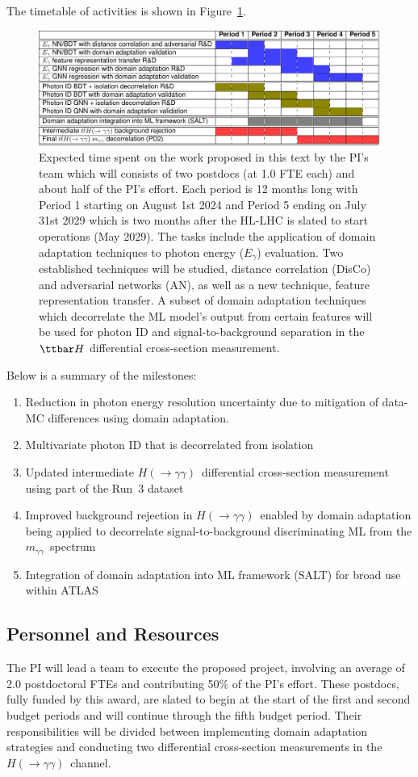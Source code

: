 \documentclass[letter, USenglish, 11pt, subfigure]{article}
\newcommand{\myy}{\ensuremath{m_{\gamma\gamma}}}
\newcommand{\hyy}{\ensuremath{H(\to\gamma\gamma)}}
\begin{document}
The timetable of activities is shown in Figure~\ref{fig:timetable}.
\begin{figure}[!htbp]
  \centering
  \includegraphics[width=\textwidth]{figures/timeline.pdf}
  \caption{Expected time spent on the work proposed in this text by the PI's team which will consists of two postdocs (at 1.0 FTE each) and about half of the PI's effort. Each period is 12 months long with Period 1 starting on August 1st 2024 and Period 5 ending on July 31st 2029 which is two months after the HL-LHC is slated to start operations (May 2029). The tasks include the application of domain adaptation  techniques to photon energy ($E_{\gamma}$) evaluation. Two established techniques will be studied, distance correlation (DisCo) and adversarial networks (AN), as well as a new technique, feature representation transfer. A subset of domain adaptation techniques which decorrelate the ML model's output from certain features will be used for photon ID and signal-to-background separation in the $\ttbar H$ differential cross-section measurement.
  }
  \label{fig:timetable}
\end{figure}

Below is a summary of the milestones:
\begin{enumerate}
\item Reduction in photon energy resolution uncertainty due to mitigation of data-MC differences using domain adaptation.
\item Multivariate photon ID that is decorrelated from isolation
  \item Updated intermediate \hyy\ differential cross-section measurement using part of the Run~3 dataset
  \item Improved background rejection in \hyy\ enabled by domain adaptation being applied to decorrelate signal-to-background discriminating ML from the \myy\ spectrum
    \item Integration of domain adaptation into ML framework (SALT) for broad use within ATLAS
\end{enumerate}

\subsection{Personnel and Resources}
\label{sec:personnel}
The PI will lead a team to execute the proposed project, involving an average of 2.0 postdoctoral FTEs and contributing 50\% of the PI's effort. These postdocs, fully funded by this award, are slated to begin at the start of the first and second budget periods and will continue through the fifth budget period. Their responsibilities will be divided between implementing domain adaptation strategies and conducting two differential cross-section measurements in the \hyy\ channel.
\end{document}
